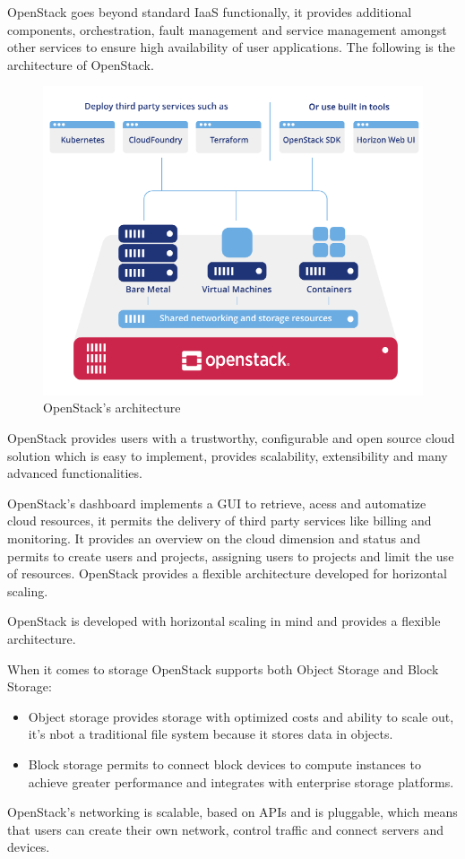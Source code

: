 OpenStack goes beyond standard IaaS functionally, it provides additional components, orchestration, fault management and service management amongst other services to ensure high availability of user applications. The following is the architecture of OpenStack.
\begin{figure}
    \centering
    \includegraphics[scale=0.6]{img/OpenStack.png}
    \caption{OpenStack's architecture}
\end{figure}
OpenStack provides users with a trustworthy, configurable and open source cloud solution which is
easy to implement, provides scalability, extensibility and many advanced functionalities.

OpenStack's dashboard implements a GUI to retrieve, acess and automatize cloud resources, it permits the delivery of third party services like billing and monitoring. It provides an overview on the cloud dimension and status and permits to create users and projects, assigning users to projects and limit the use of resources. OpenStack provides a flexible architecture developed for horizontal scaling.

OpenStack is developed with horizontal scaling in mind and provides a flexible architecture.

When it comes to storage OpenStack supports both Object Storage and Block Storage:
\begin{itemize}
    \item Object storage provides storage with optimized costs and ability to scale out, it's nbot a traditional file system because it stores data in objects.
    \item Block storage permits to connect block devices to compute instances to achieve greater performance and integrates with enterprise storage platforms.
\end{itemize}
OpenStack's networking is scalable, based on APIs and is pluggable, which means that users can create their own network, control traffic and connect servers and devices.

